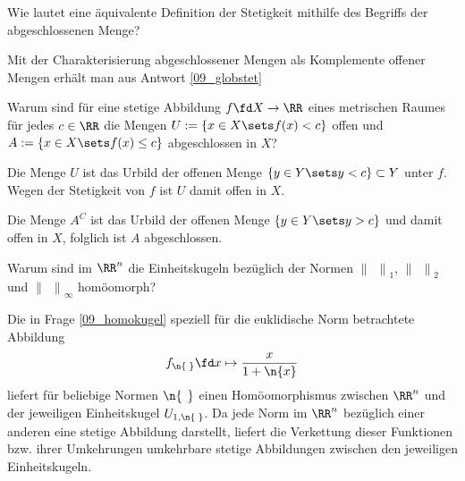 \begin{frage}
  Wie lautet eine äquivalente Definition der Stetigkeit mithilfe 
  des Begriffs der abgeschlossenen Menge?
\end{frage}

\begin{antwort}
  Mit der Charakterisierung abgeschlossener Mengen 
  als Komplemente offener Mengen erhält man aus Antwort \ref{09_globstet} 

  \medskip
  \noindent 
  \AntEnd 
\end{antwort}



\begin{frage}
  Warum sind für eine stetige Abbildung $f\fd X\to \RR$ eines metrischen 
  Raumes für jedes $c\in\RR$ die Mengen 
  $U := \{ x\in X \sets f(x) < c \}$ offen und 
  $A := \{ x\in X \sets f(x) \le c \}$ abgeschlossen in $X$?
\end{frage}

\begin{antwort}
  Die Menge $U$ ist das Urbild der offenen Menge 
  $\{ y \in Y\sets y < c \} \subset Y$ unter $f$. 
  Wegen der Stetigkeit  von $f$ ist $U$ damit offen in $X$.

  Die Menge $A^C$ ist das Urbild der offenen Menge 
  $\{ y \in Y\sets y > c \}$ und damit offen in $X$, folglich ist 
  $A$ abgeschlossen.
  \AntEnd
\end{antwort}

\begin{frage}
  Warum sind im $\RR^n$ die Einheitskugeln bezüglich der 
  Normen ${\| \; \, \|}_1$, ${\| \; \, \|}_2$ und 
  ${\| \; \, \|}_\infty$ homöomorph?
\end{frage}

\begin{antwort}
  Die in Frage \ref{09_homokugel} 
  speziell für die euklidische Norm 
  betrachtete Abbildung 
  \[
  f_{\n{\;}} \fd x \mapsto \frac{x}{1+\n{x}} 
  \]
  liefert für beliebige Normen $\n{\;\,}$ einen Homöomorphismus 
  zwischen $\RR^n$ und der jeweiligen Einheitskugel $U_{1,\n{\;}}$. 
  Da jede Norm im $\RR^n$ bezüglich einer anderen eine stetige Abbildung 
  darstellt, liefert die Verkettung dieser Funktionen bzw. ihrer 
  Umkehrungen umkehrbare stetige Abbildungen zwischen den jeweiligen 
  Einheitskugeln.
  \AntEnd  
\end{antwort}

